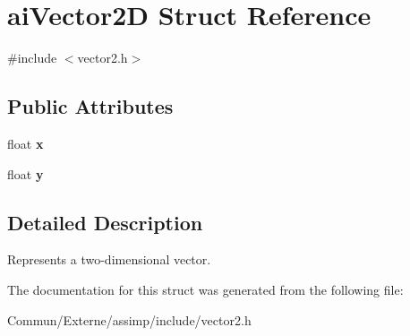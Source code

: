 \hypertarget{structai_vector2_d}{}\section{ai\+Vector2D Struct Reference}
\label{structai_vector2_d}


{\ttfamily \#include $<$vector2.\+h$>$}

\subsection*{Public Attributes}
\begin{DoxyCompactItemize}
\item 
float {\bfseries x}\hypertarget{structai_vector2_d_a968e4db235e054f58b4c320576d82740}{}\label{structai_vector2_d_a968e4db235e054f58b4c320576d82740}

\item 
float {\bfseries y}\hypertarget{structai_vector2_d_a7bb1686f941459496627a3b8ce68e73f}{}\label{structai_vector2_d_a7bb1686f941459496627a3b8ce68e73f}

\end{DoxyCompactItemize}


\subsection{Detailed Description}
Represents a two-\/dimensional vector. 

The documentation for this struct was generated from the following file\+:\begin{DoxyCompactItemize}
\item 
Commun/\+Externe/assimp/include/vector2.\+h\end{DoxyCompactItemize}
